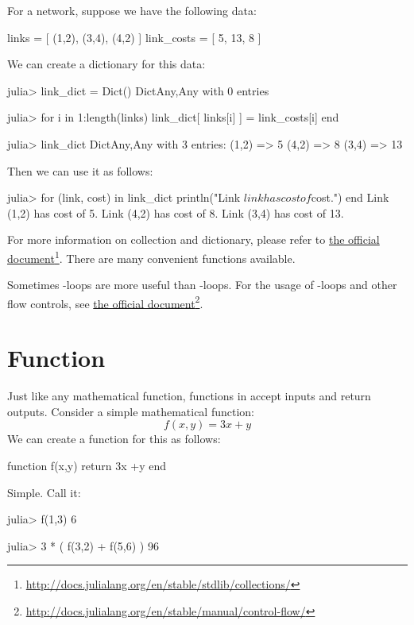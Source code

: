 For a network, suppose we have the following data:
\begin{code}
links = [ (1,2), (3,4), (4,2) ]
link_costs = [ 5, 13, 8 ]
\end{code}
\noindent We can create a dictionary for this data:
\begin{code}
julia> link_dict = Dict()
Dict{Any,Any} with 0 entries

julia> for i in 1:length(links)
           link_dict[ links[i] ] = link_costs[i]
       end

julia> link_dict
Dict{Any,Any} with 3 entries:
  (1,2) => 5
  (4,2) => 8
  (3,4) => 13
\end{code}
\noindent Then we can use it as follows:
\begin{code}
julia> for (link, cost) in link_dict
           println("Link $link has cost of $cost.")
       end
Link (1,2) has cost of 5.
Link (4,2) has cost of 8.
Link (3,4) has cost of 13.
\end{code}

For more information on collection and dictionary, please refer to \href{http://docs.julialang.org/en/stable/stdlib/collections/}{the official document}\footnote{\url{http://docs.julialang.org/en/stable/stdlib/collections/}}. There are many convenient functions available.

Sometimes -loops are more useful than -loops. For the usage of -loops and other flow controls, see \href{http://docs.julialang.org/en/stable/manual/control-flow/}{the official document}\footnote{\url{http://docs.julialang.org/en/stable/manual/control-flow/}}.




\section{Function}

Just like any mathematical function, functions in \julia{} accept inputs and return outputs. Consider a simple mathematical function:
\[
	f(x,y) = 3x + y
\]
We can create a \julia{} function for this as follows:
\begin{code}
function f(x,y)
	return 3x +y
end
\end{code}
\noindent Simple. Call it:
\begin{code}
julia> f(1,3)
6

julia> 3 * ( f(3,2) + f(5,6) )
96
\end{code}

